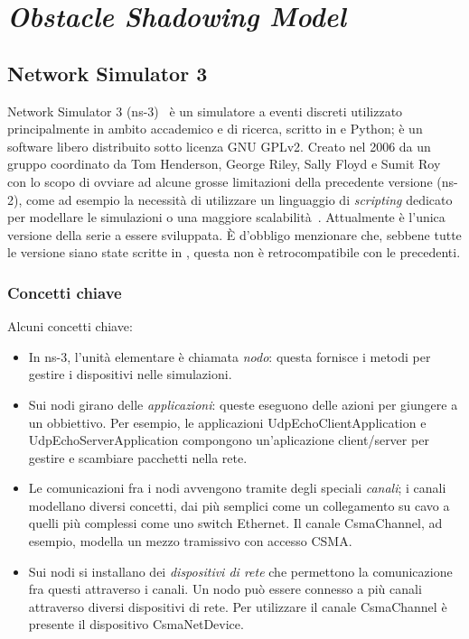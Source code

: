 %
\chapter{\textit{Obstacle Shadowing Model}}
\section{Network Simulator 3}
Network Simulator 3 (ns-3)~\cite{ns3Website} è un simulatore a eventi discreti utilizzato principalmente in ambito accademico e di ricerca,
scritto in \Cpp e Python; è un software libero distribuito sotto licenza GNU GPLv2.
Creato nel 2006 da un gruppo coordinato da Tom Henderson, George Riley, Sally Floyd e Sumit Roy con lo scopo
di ovviare ad alcune grosse limitazioni della precedente versione (ns-2), come ad esempio la necessità di utilizzare
un linguaggio di \textit{scripting} dedicato per modellare le simulazioni o una maggiore scalabilità~\cite{Henderson:2006:NPG:1190455.1190468}.
Attualmente è l'unica versione della serie a essere sviluppata.
È d'obbligo menzionare che, sebbene tutte le versione siano state scritte in \Cpp, questa non è retrocompatibile con le precedenti.
%
\subsection{Concetti chiave}
Alcuni concetti chiave:
\begin{itemize}
	\item In ns-3, l'unità elementare è chiamata \textit{nodo}: questa fornisce i metodi per gestire i dispositivi nelle simulazioni.
	\item Sui nodi girano delle \textit{applicazioni}: queste eseguono delle azioni per giungere a un obbiettivo.
				Per esempio, le applicazioni \textsf{UdpEchoClientApplication} e \textsf{UdpEchoServerApplication} compongono
				un'aplicazione client/server per gestire e scambiare pacchetti nella rete.
	\item Le comunicazioni fra i nodi avvengono tramite degli speciali \textit{canali};
				i canali modellano diversi concetti, dai più semplici come un collegamento su cavo a quelli più complessi
				come uno switch Ethernet.
				Il canale \textsf{CsmaChannel}, ad esempio, modella un mezzo tramissivo con accesso CSMA.
	\item Sui nodi si installano dei \textit{dispositivi di rete} che permettono la comunicazione fra questi attraverso i canali.
				Un nodo può essere connesso a più canali attraverso diversi dispositivi di rete.
				Per utilizzare il canale \textsf{CsmaChannel} è presente il dispositivo \textsf{CsmaNetDevice}.
\end{itemize}
%
